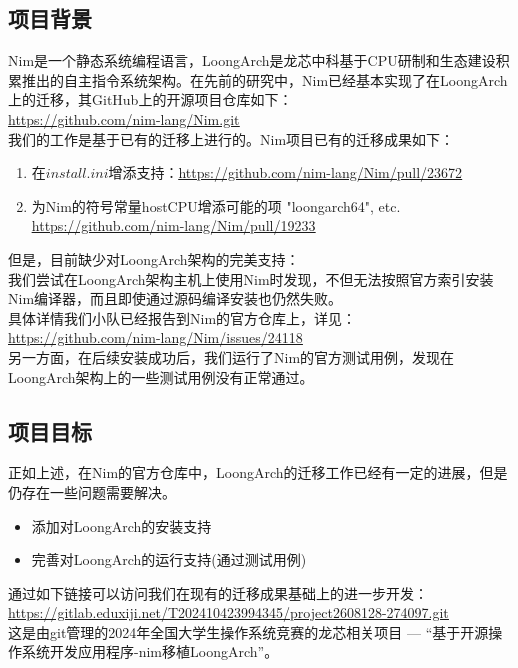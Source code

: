 \documentclass[UTF8]{ctexart}
\def\nimGitRepo{https://github.com/nim-lang/Nim}
\def\nimPR#1{\nimGitRepo/pull/#1}
\def\nimIssue#1{\nimGitRepo/issues/#1}
\begin{document}
	\subsection{项目背景} %
	Nim是一个静态系统编程语言，LoongArch是龙芯中科基于CPU研制和生态建设积累推出的自主指令系统架构。在先前的研究中，Nim已经基本实现了在LoongArch上的迁移，其GitHub上的开源项目仓库如下： \\
	\hspace*{2em}\textcolor[RGB]{0, 102, 204}{\underline{\url{https://github.com/nim-lang/Nim.git}}}  \\
	\hspace*{2em}我们的工作是基于已有的迁移上进行的。Nim项目已有的迁移成果如下：
	\begin{enumerate}[leftmargin=3.5em]
		\item 在$ install.ini $增添支持：\underline{\url{\nimPR{23672}}}
		\item 为Nim的符号常量hostCPU增添可能的项 "loongarch64", etc.  \\\underline{\url{\nimPR{19233}}}
	\end{enumerate}
	\hspace*{2em}但是，目前缺少对LoongArch架构的完美支持： \\
	\hspace*{2em}我们尝试在LoongArch架构主机上使用Nim时发现，不但无法按照官方索引安装Nim编译器，而且即使通过源码编译安装也仍然失败。 \\
	\hspace*{2em}具体详情我们小队已经报告到Nim的官方仓库上，详见： \\
	\hspace*{2em}\underline{\url{\nimIssue{24118}}} \\
	\hspace*{2em}另一方面，在后续安装成功后，我们运行了Nim的官方测试用例，发现在LoongArch架构上的一些测试用例没有正常通过。
	\subsection{项目目标} %
	正如上述，在Nim的官方仓库中，LoongArch的迁移工作已经有一定的进展，但是仍存在一些问题需要解决。
	\begin{itemize}[leftmargin=3.5em]
		\item 添加对LoongArch的安装支持
		\item 完善对LoongArch的运行支持(通过测试用例)
	\end{itemize}
	\hspace*{2em}通过如下链接可以访问我们在现有的迁移成果基础上的进一步开发：\\
	\hspace*{2em}\textcolor[RGB]{0, 102, 204}{\underline{\url{https://gitlab.eduxiji.net/T202410423994345/project2608128-274097.git}}} \\
	\hspace*{2em}这是由git管理的2024年全国大学生操作系统竞赛的龙芯相关项目 --- “基于开源操作系统开发应用程序-nim移植LoongArch”。
\end{document}
